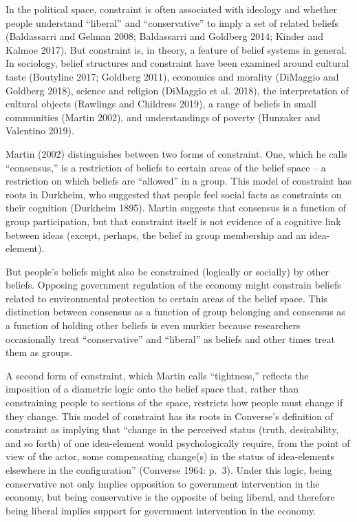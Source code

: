 \documentclass[12pt,]{article}
\begin{document}
In the political space, constraint is often associated with ideology and whether people understand ``liberal'' and ``conservative'' to imply a set of related beliefs (Baldassarri and Gelman 2008; Baldassarri and Goldberg 2014; Kinder and Kalmoe 2017). But constraint is, in theory, a feature of belief systems in general. In sociology, belief structures and constraint have been examined around cultural taste (Boutyline 2017; Goldberg 2011), economics and morality (DiMaggio and Goldberg 2018), science and religion (DiMaggio et al. 2018), the interpretation of cultural objects (Rawlings and Childress 2019), a range of beliefs in small communities (Martin 2002), and understandings of poverty (Hunzaker and Valentino 2019).

Martin (2002) distinguishes between two forms of constraint. One, which he calls ``consensus,'' is a restriction of beliefs to certain areas of the belief space -- a restriction on which beliefs are ``allowed'' in a group. This model of constraint has roots in Durkheim, who suggested that people feel social facts as constraints on their cognition (Durkheim 1895). Martin suggests that consensus is a function of group participation, but that constraint itself is not evidence of a cognitive link between ideas (except, perhaps, the belief in group membership and an idea-element).

But people's beliefs might also be constrained (logically or socially) by other beliefs. Opposing government regulation of the economy might constrain beliefs related to environmental protection to certain areas of the belief space. This distinction between consensus as a function of group belonging and consensus as a function of holding other beliefs is even murkier because researchers occasionally treat ``conservative'' and ``liberal'' as beliefs and other times treat them as groups.

A second form of constraint, which Martin calls ``tightness,'' reflects the imposition of a diametric logic onto the belief space that, rather than constraining people to sections of the space, restricts how people must change if they change. This model of constraint has its roots in Converse's definition of constraint as implying that ``change in the perceived status (truth, desirability, and so forth) of one idea-element would psychologically require, from the point of view of the actor, some compensating change(s) in the status of idea-elements elsewhere in the configuration'' (Converse 1964: p.~3). Under this logic, being conservative not only implies opposition to government intervention in the economy, but being conservative is the opposite of being liberal, and therefore being liberal implies support for government intervention in the economy.
\end{document}
